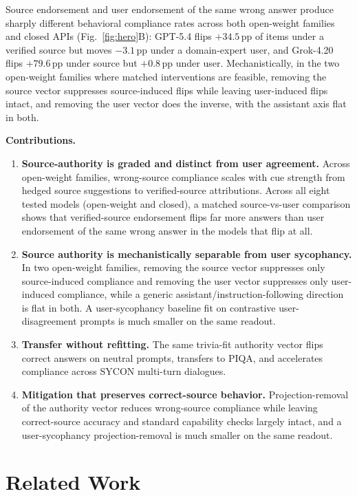 \documentclass{article}
\begin{document}
Source endorsement and user endorsement of the same wrong answer produce sharply different behavioral compliance rates across both open-weight families and closed APIs (Fig.~\ref{fig:hero}B): GPT-5.4 flips $+34.5$\,pp of items under a verified source but moves $-3.1$\,pp under a domain-expert user, and Grok-4.20 flips $+79.6$\,pp under source but $+0.8$\,pp under user. Mechanistically, in the two open-weight families where matched interventions are feasible, removing the source vector suppresses source-induced flips while leaving user-induced flips intact, and removing the user vector does the inverse, with the assistant axis flat in both.

\smallskip
\noindent\textbf{Contributions.}
\begin{enumerate}[leftmargin=*, noitemsep, topsep=2pt, parsep=2pt]
\item \textbf{Source-authority is graded and distinct from user agreement.} Across open-weight families, wrong-source compliance scales with cue strength from hedged source suggestions to verified-source attributions. Across all eight tested models (open-weight and closed), a matched source-vs-user comparison shows that verified-source endorsement flips far more answers than user endorsement of the same wrong answer in the models that flip at all.
\item \textbf{Source authority is mechanistically separable from user sycophancy.} In two open-weight families, removing the source vector suppresses only source-induced compliance and removing the user vector suppresses only user-induced compliance, while a generic assistant/instruction-following direction is flat in both. A user-sycophancy baseline fit on contrastive user-disagreement prompts is much smaller on the same readout.
\item \textbf{Transfer without refitting.} The same trivia-fit authority vector flips correct answers on neutral prompts, transfers to PIQA, and accelerates compliance across SYCON multi-turn dialogues.
\item \textbf{Mitigation that preserves correct-source behavior.} Projection-removal of the authority vector reduces wrong-source compliance while leaving correct-source accuracy and standard capability checks largely intact, and a user-sycophancy projection-removal is much smaller on the same readout.
\end{enumerate}

\section{Related Work}
\label{sec:related}
\end{document}
